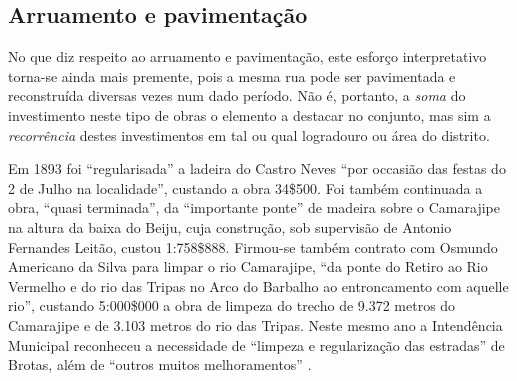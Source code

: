 \subsection{Arruamento e pavimentação}

No que diz respeito ao arruamento e pavimentação, este esforço interpretativo torna-se ainda mais premente, pois a mesma rua pode ser pavimentada e reconstruída diversas vezes num dado período. Não é, portanto, a \textit{soma} do investimento neste tipo de obras o elemento a destacar no conjunto, mas sim a \textit{recorrência} destes investimentos em tal ou qual logradouro ou área do distrito.

Em 1893 foi ``regularisada'' a ladeira do Castro Neves ``por occasião das festas
do 2 de Julho na localidade'', custando a obra 34\$500. Foi também continuada a obra, ``quasi terminada'', da ``importante ponte'' de madeira sobre o Camarajipe na altura da baixa do Beiju, cuja construção, sob supervisão de Antonio Fernandes Leitão, custou 1:758\$888. Firmou-se também contrato com Osmundo Americano da Silva para limpar o rio Camarajipe, ``da ponte do Retiro ao Rio Vermelho e do rio das Tripas no Arco do Barbalho ao entroncamento com aquelle rio'', custando 5:000\$000 a obra de limpeza do trecho de 9.372 metros do Camarajipe e de 3.103 metros do rio das Tripas. Neste mesmo ano a Intendência Municipal reconheceu a necessidade de ``limpeza e regularização das estradas'' de Brotas, além de ``outros muitos melhoramentos'' \cite[pp.~47-48; anexo 3, pp.~18-19]{salvador_relatorio_1893}.

